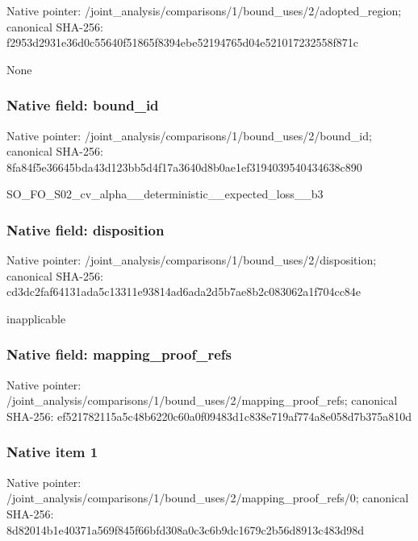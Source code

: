 \documentclass[10pt,a4paper]{article}
\begin{document}
Native pointer: /joint\_analysis/comparis\allowbreak{}ons/1/bound\_uses/2/adopt\allowbreak{}ed\_region; canonical SHA-256: f2953d2931e36d0c55640f51\allowbreak{}865f8394ebe52194765d04e5\allowbreak{}21017232558f871c


None


\subsubsection{Native field: bound\_id}


Native pointer: /joint\_analysis/comparis\allowbreak{}ons/1/bound\_uses/2/bound\allowbreak{}\_id; canonical SHA-256: 8fa84f5e36645bda43d123bb\allowbreak{}5d4f17a3640d8b0ae1ef3194\allowbreak{}039540434638c890


SO\_FO\_S02\_cv\_alpha\_\_dete\allowbreak{}rministic\_\_expected\_loss\allowbreak{}\_\_b3


\subsubsection{Native field: disposition}


Native pointer: /joint\_analysis/comparis\allowbreak{}ons/1/bound\_uses/2/dispo\allowbreak{}sition; canonical SHA-256: cd3dc2faf64131ada5c13311\allowbreak{}e93814ad6ada2d5b7ae8b2c0\allowbreak{}83062a1f704cc84e


inapplicable


\subsubsection{Native field: mapping\_proof\_refs}


Native pointer: /joint\_analysis/comparis\allowbreak{}ons/1/bound\_uses/2/mappi\allowbreak{}ng\_proof\_refs; canonical SHA-256: ef521782115a5c48b6220c60\allowbreak{}a0f09483d1c838e719af774a\allowbreak{}8e058d7b375a810d



\subsubsection{Native item 1}


Native pointer: /joint\_analysis/comparis\allowbreak{}ons/1/bound\_uses/2/mappi\allowbreak{}ng\_proof\_refs/0; canonical SHA-256: 8d82014b1e40371a569f845f\allowbreak{}66bfd308a0c3c6b9dc1679c2\allowbreak{}b56d8913c483d98d
\end{document}
